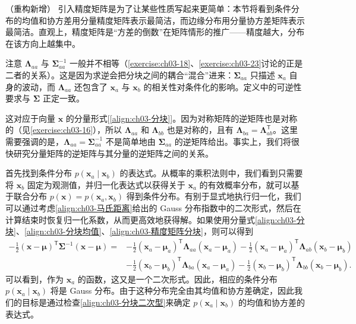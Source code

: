 \documentclass[../../main.tex]{subfiles}
\begin{document}
\begin{remark}（重构新增）
引入精度矩阵是为了让某些性质写起来更简单：本节将看到条件分布的均值和协方差用分量精度矩阵表示最简洁，而边缘分布用分量协方差矩阵表示最简洁。直观上，精度矩阵是“方差的倒数”在矩阵情形的推广——精度越大，分布在该方向上越集中。

注意 $\boldsymbol{\Lambda}_{aa}$ 与 $\boldsymbol{\Sigma}_{aa}^{-1}$ 一般并不相等（\cref{exercise:ch03-18}、\cref{exercise:ch03-23}讨论的正是二者的关系）。这是因为求逆会把分块之间的耦合“混合”进来：$\boldsymbol{\Sigma}_{aa}$ 只描述 $\boldsymbol{x}_a$ 自身的波动，而 $\boldsymbol{\Lambda}_{aa}$ 还包含了 $\boldsymbol{x}_a$ 与 $\boldsymbol{x}_b$ 的相关性对条件化的影响。定义中的可逆性要求与 $\boldsymbol{\Sigma}$ 正定一致。
\end{remark}

这对应于向量 $\boldsymbol{x}$ 的分量形式[\eqref{align:ch03-分块}]。因为对称矩阵的逆矩阵也是对称的（见\cref{exercise:ch03-16}），所以 $\boldsymbol{\Lambda}_{aa}$ 和 $\boldsymbol{\Lambda}_{bb}$ 也是对称的，且有 $\boldsymbol{\Lambda}_{ba}=\boldsymbol{\Lambda}_{ab}^{\mathsf{T}}$。这里需要强调的是，$\boldsymbol{\Lambda}_{aa}=\boldsymbol{\Sigma}_{aa}^{-1}$ 不是简单地由 $\boldsymbol{\Sigma}_{aa}$ 的逆矩阵给出。事实上，我们将很快研究分量矩阵的逆矩阵与其分量的逆矩阵之间的关系。

首先找到条件分布 $p(\boldsymbol{x}_{a}\mid\boldsymbol{x}_{b})$ 的表达式。从概率的乘积法则中，我们看到只需要将 $\boldsymbol{x}_{b}$ 固定为观测值，并归一化表达式以获得关于 $\boldsymbol{x}_{a}$ 的有效概率分布，就可以基于联合分布 $p(\boldsymbol{x})=p(\boldsymbol{x}_{a},\boldsymbol{x}_{b})$ 得到条件分布。有别于显式地执行归一化，我们可以通过考虑\eqref{align:ch03-马氏距离}给出的 Gauss 分布指数中的二次形式，然后在计算结束时恢复归一化系数，从而更高效地获得解。如果使用分量式\eqref{align:ch03-分块}、\eqref{align:ch03-分块均值}、\eqref{align:ch03-精度矩阵分块}，则可以得到
\begin{align}
-\frac{1}{2}(\boldsymbol{x}-\boldsymbol{\mu})^{\mathsf{T}}\boldsymbol{\Sigma}^{-1}(\boldsymbol{x}-\boldsymbol{\mu})=
&-\frac{1}{2}(\boldsymbol{x}_{a}-\boldsymbol{\mu}_{a})^{\mathsf{T}}\boldsymbol{\Lambda}_{aa}(\boldsymbol{x}_{a}-\boldsymbol{\mu}_{a})-\frac{1}{2}(\boldsymbol{x}_{a}-\boldsymbol{\mu}_{a})^{\mathsf{T}}\boldsymbol{\Lambda}_{ab}(\boldsymbol{x}_{b}-\boldsymbol{\mu}_{b})\nonumber\\
&-\frac{1}{2}(\boldsymbol{x}_{b}-\boldsymbol{\mu}_{b})^{\mathsf{T}}\boldsymbol{\Lambda}_{ba}(\boldsymbol{x}_{a}-\boldsymbol{\mu}_{a})-\frac{1}{2}(\boldsymbol{x}_{b}-\boldsymbol{\mu}_{b})^{\mathsf{T}}\boldsymbol{\Lambda}_{bb}(\boldsymbol{x}_{b}-\boldsymbol{\mu}_{b}).
\label{align:ch03-分块二次型}
\end{align}
可以看到，作为 $\boldsymbol{x}_{a}$ 的函数，这又是一个二次形式。因此，相应的条件分布 $p(\boldsymbol{x}_{a}\mid\boldsymbol{x}_{b})$ 将是 Gauss 分布。由于这种分布完全由其均值和协方差确定，因此我们的目标是通过检查\eqref{align:ch03-分块二次型}来确定 $p(\boldsymbol{x}_{a}\mid\boldsymbol{x}_{b})$ 的均值和协方差的表达式。
\end{document}
